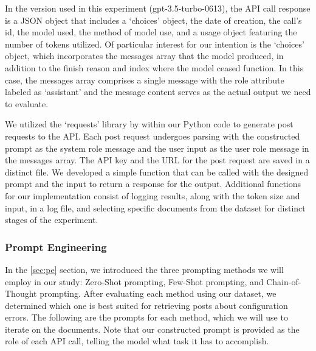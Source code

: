\documentclass[english,bachelor]{swsLeipzig}
\begin{document}
In the version used in this experiment (gpt-3.5-turbo-0613), the API call response is a JSON object that includes a 
`choices' object, the date of creation, the call's id, the model used, the method of model use, and a usage object featuring the number of tokens utilized. Of particular interest for our intention is the `choices' object, which incorporates the messages array that the model produced, in addition to the finish reason and index where the model ceased function. In this case, the messages array comprises a single message with the role attribute labeled as `assistant' and the message content serves as the actual output we need to evaluate.

We utilized the `requests' library by \citeauthor{reitz:nd} within our Python code to generate post requests to the API. 
Each post request undergoes parsing with the constructed prompt as the system role message and the user input as the user role message in the messages array. The API key and the URL for the post request are saved in a distinct file. We developed a simple function that can be called with the designed prompt and the input to return a response for the output. Additional functions for our implementation consist of logging results, along with the token size and input, in a log file, and selecting specific documents from the dataset for distinct stages of the experiment.

\subsubsection{Prompt Engineering}
In the \ref{sec:pe} section, we introduced the three prompting methods we will employ in our study: 
Zero-Shot prompting, Few-Shot prompting, and Chain-of-Thought prompting. After evaluating each method using our dataset, we determined which one is best suited for retrieving posts about configuration errors. The following are the prompts for each method, which we will use to iterate on the documents. Note that our constructed prompt is provided as the role of each API call, telling the model what task it has to accomplish.
\end{document}
